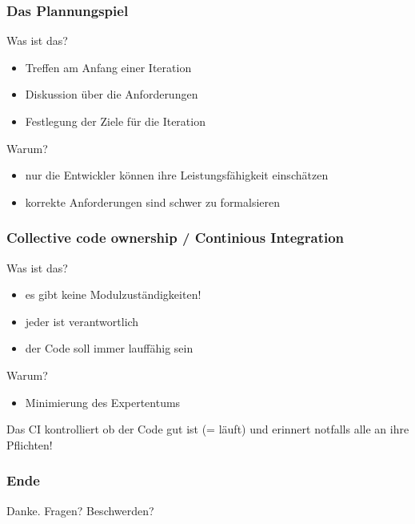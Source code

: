 \documentclass{beamer}
\begin{document}
\begin{frame}
    \frametitle{Das Plannungspiel}
    
    \begin{block}{Was ist das?}
        \begin{itemize}
            \item Treffen am Anfang einer Iteration
            \item Diskussion über die Anforderungen
            \item Festlegung der Ziele für die Iteration
        \end{itemize}
    \end{block}

    \begin{block}{Warum?}
        \begin{itemize}
            \item nur die Entwickler können ihre Leistungsfähigkeit einschätzen
            \item korrekte Anforderungen sind schwer zu formalsieren
        \end{itemize}
    \end{block}

\end{frame}


\begin{frame}
    \frametitle{Collective code ownership / Continious Integration}
    
    \begin{block}{Was ist das?}
        \begin{itemize}
            \item es gibt keine Modulzuständigkeiten!
            \item jeder ist verantwortlich
            \item der Code soll immer lauffähig sein
        \end{itemize}
    \end{block}

    \begin{block}{Warum?}
        \begin{itemize}
            \item Minimierung des Expertentums
        \end{itemize}
    \end{block}

    Das CI kontrolliert ob der Code gut ist (= läuft) und erinnert notfalls alle an ihre Pflichten!
\end{frame}

\begin{frame}
    \frametitle{Ende}

	Danke. Fragen? Beschwerden?

\end{frame}
\end{document}
